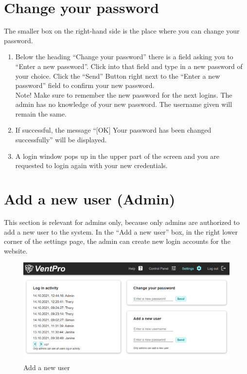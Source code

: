 \newpage
\section{Change your password}
\label{sec:change_your_password}

The smaller box on the right-hand side is the place where you can change your password.

\begin{enumerate}[wide,  labelwidth=0.3cm,  labelindent=0pt, leftmargin=0.5cm]
\item Below the heading “Change your password” there is a field asking you to “Enter a new password”. Click into that field and type in a new password of your choice. Click the “Send” Button right next to the “Enter a new password” field to confirm your new password.\\
\color{red}
Note! Make sure to remember the new password for the next logins. The admin has no knowledge of your new password. The username given will remain the same.
\color{black}

\item If successful, the message “[OK] Your password has been changed successfully” will be displayed.
\item A login window pops up in the upper part of the screen and you are requested to login again with your new credentials.
\end{enumerate}



\section{Add a new user (Admin)}
\label{sec:add_a_new_user}

This section is relevant for admins only, because only admins are authorized to add a new user to the system. In the “Add a new user” box, in the right lower corner of the settings page, the admin can create new login accounts for the website.

\vspace{0.5cm}
\begin{figure}[h]
\centering
\includegraphics[width=1.0\textwidth]{img/Picture7}
\caption{Add a new user}
\label{fig:picture_7}
\end{figure}
\vspace{0.3cm}

